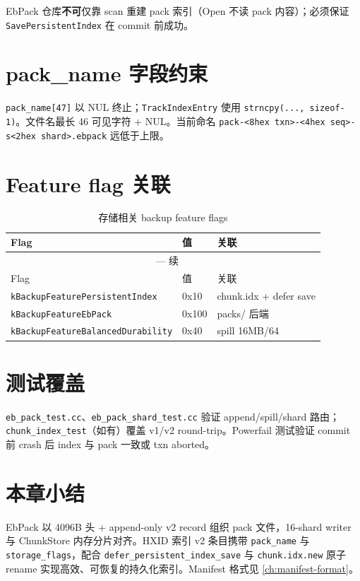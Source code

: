 EbPack 仓库\textbf{不可}仅靠 scan 重建 pack 索引（Open 不读 pack 内容）；必须保证 \texttt{SavePersistentIndex} 在 commit 前成功。

\section{pack\_name 字段约束}

\texttt{pack\_name[47]} 以 NUL 终止；\texttt{TrackIndexEntry} 使用 \texttt{strncpy(..., sizeof-1)}。文件名最长 46 可见字符 + NUL。当前命名 \texttt{pack-<8hex txn>-<4hex seq>-s<2hex shard>.ebpack} 远低于上限。

\section{Feature flag 关联}

\begin{longtable}{@{}lll@{}}
\caption{存储相关 backup feature flags} \\
\toprule
Flag & 值 & 关联 \\
\midrule
\endfirsthead
\multicolumn{3}{c}{\tablename\ \thetable{} — 续} \\
\toprule
Flag & 值 & 关联 \\
\midrule
\endhead
\texttt{kBackupFeaturePersistentIndex} & 0x10 & chunk.idx + defer save \\
\texttt{kBackupFeatureEbPack} & 0x100 & packs/ 后端 \\
\texttt{kBackupFeatureBalancedDurability} & 0x40 & spill 16MB/64 \\
\bottomrule
\end{longtable}

\section{测试覆盖}

\texttt{eb\_pack\_test.cc}、\texttt{eb\_pack\_shard\_test.cc} 验证 append/spill/shard 路由；\texttt{chunk\_index\_test}（如有）覆盖 v1/v2 round-trip。Powerfail 测试验证 commit 前 crash 后 index 与 pack 一致或 txn aborted。

\section{本章小结}

EbPack 以 4096B 头 + append-only v2 record 组织 pack 文件，16-shard writer 与 ChunkStore 内存分片对齐。HXID 索引 v2 条目携带 \texttt{pack\_name} 与 \texttt{storage\_flags}，配合 \texttt{defer\_persistent\_index\_save} 与 \texttt{chunk.idx.new} 原子 rename 实现高效、可恢复的持久化索引。Manifest 格式见 \cref{ch:manifest-format}。
